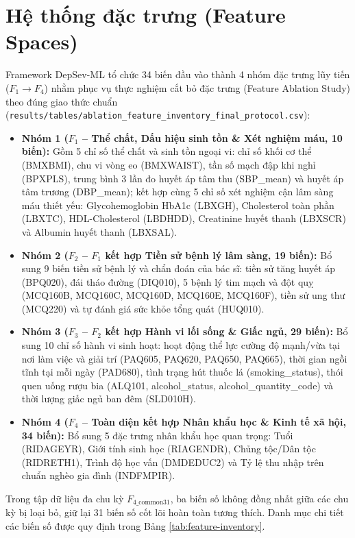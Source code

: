 \section{Hệ thống đặc trưng (Feature Spaces)}
\label{sec:he-thong-dac-trung}

Framework DepSev-ML tổ chức 34 biến đầu vào thành 4 nhóm đặc trưng lũy tiến ($F_1 \to F_4$) nhằm phục vụ thực nghiệm cắt bỏ đặc trưng (Feature Ablation Study) theo đúng giao thức chuẩn (\texttt{results/tables/ablation\_feature\_inventory\_final\_protocol.csv}):
\begin{itemize}
    \item \textbf{Nhóm 1 ($F_1$ -- Thể chất, Dấu hiệu sinh tồn \& Xét nghiệm máu, 10 biến):} Gồm 5 chỉ số thể chất và sinh tồn ngoại vi: chỉ số khối cơ thể (BMXBMI), chu vi vòng eo (BMXWAIST), tần số mạch đập khi nghỉ (BPXPLS), trung bình 3 lần đo huyết áp tâm thu (SBP\_mean) và huyết áp tâm trương (DBP\_mean); kết hợp cùng 5 chỉ số xét nghiệm cận lâm sàng máu thiết yếu: Glycohemoglobin HbA1c (LBXGH), Cholesterol toàn phần (LBXTC), HDL-Cholesterol (LBDHDD), Creatinine huyết thanh (LBXSCR) và Albumin huyết thanh (LBXSAL).
    \item \textbf{Nhóm 2 ($F_2$ -- $F_1$ kết hợp Tiền sử bệnh lý lâm sàng, 19 biến):} Bổ sung 9 biến tiền sử bệnh lý và chẩn đoán của bác sĩ: tiền sử tăng huyết áp (BPQ020), đái tháo đường (DIQ010), 5 bệnh lý tim mạch và đột quỵ (MCQ160B, MCQ160C, MCQ160D, MCQ160E, MCQ160F), tiền sử ung thư (MCQ220) và tự đánh giá sức khỏe tổng quát (HUQ010).
    \item \textbf{Nhóm 3 ($F_3$ -- $F_2$ kết hợp Hành vi lối sống \& Giấc ngủ, 29 biến):} Bổ sung 10 chỉ số hành vi sinh hoạt: hoạt động thể lực cường độ mạnh/vừa tại nơi làm việc và giải trí (PAQ605, PAQ620, PAQ650, PAQ665), thời gian ngồi tĩnh tại mỗi ngày (PAD680), tình trạng hút thuốc lá (smoking\_status), thói quen uống rượu bia (ALQ101, alcohol\_status, alcohol\_quantity\_code) và thời lượng giấc ngủ ban đêm (SLD010H).
    \item \textbf{Nhóm 4 ($F_4$ -- Toàn diện kết hợp Nhân khẩu học \& Kinh tế xã hội, 34 biến):} Bổ sung 5 đặc trưng nhân khẩu học quan trọng: Tuổi (RIDAGEYR), Giới tính sinh học (RIAGENDR), Chủng tộc/Dân tộc (RIDRETH1), Trình độ học vấn (DMDEDUC2) và Tỷ lệ thu nhập trên chuẩn nghèo gia đình (INDFMPIR).
\end{itemize}

Trong tập dữ liệu đa chu kỳ $F_{4\_\text{common31}}$, ba biến số không đồng nhất giữa các chu kỳ bị loại bỏ, giữ lại 31 biến số cốt lõi hoàn toàn tương thích. Danh mục chi tiết các biến số được quy định trong Bảng \ref{tab:feature-inventory}.

